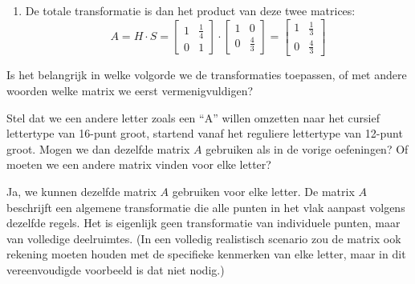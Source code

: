 \documentclass{ximera}
\begin{document}
\begin{exercise}
\begin{oplossing}
\begin{enumerate}
        \item De totale transformatie is dan het product van deze twee matrices:
        \[A = H \cdot S = \begin{bmatrix} 1 & \frac{1}{4} \\ 0 & 1 \end{bmatrix} \cdot \begin{bmatrix} 1 & 0 \\ 0 & \frac{4}{3} \end{bmatrix} = \begin{bmatrix} 1 & \frac{1}{3} \\ 0 & \frac{4}{3} \end{bmatrix}\]
    \end{enumerate}
    Is het belangrijk in welke volgorde we de transformaties toepassen, of met andere woorden welke matrix we eerst vermenigvuldigen?
\end{oplossing}
\end{exercise}

\begin{exercise}
    Stel dat we een andere letter zoals een ``A'' willen omzetten naar het cursief lettertype van 16-punt groot, startend vanaf het reguliere lettertype van 12-punt groot.
    Mogen we dan dezelfde matrix $A$ gebruiken als in de vorige oefeningen?
    Of moeten we een andere matrix vinden voor elke letter?
    \begin{image}
    \end{image}
    
    \begin{oplossing}
    Ja, we kunnen dezelfde matrix $A$ gebruiken voor elke letter.
    De matrix $A$ beschrijft een algemene transformatie die alle punten in het vlak aanpast volgens dezelfde regels.
    Het is eigenlijk geen transformatie van individuele punten, maar van volledige deelruimtes.
    (In een volledig realistisch scenario zou de matrix ook rekening moeten houden met de specifieke kenmerken van elke letter, maar in dit vereenvoudigde voorbeeld is dat niet nodig.)
    \end{oplossing}
    
\end{exercise}
\end{document}
